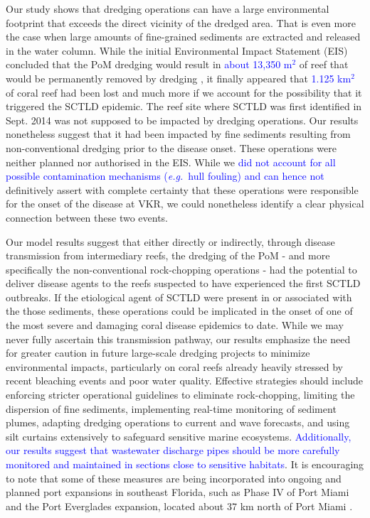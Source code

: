\documentclass[preprint,12pt,authoryear]{elsarticle}
\newcommand{\modif}[1]{\textcolor{blue}{#1}}
\begin{document}
Our study shows that dredging operations can have a large environmental footprint that exceeds the direct vicinity of the dredged area. That is even more the case when large amounts of fine-grained sediments are extracted and released in the water column. While the initial Environmental Impact Statement (EIS) concluded that the PoM dredging would result in \modif{about 13,350 m$^{2}$} of reef that would be permanently removed by dredging \citep{USACE2004}, it finally appeared that \modif{1.125 km$^{2}$} of coral reef had been lost \cite{noaa2023sedimentation} and much more if we account for the possibility that it triggered the SCTLD epidemic. The reef site where SCTLD was first identified in Sept. 2014 was not supposed to be impacted by dredging operations. Our results nonetheless suggest that it had been impacted by fine sediments resulting from non-conventional dredging prior to the disease onset. These operations were neither planned nor authorised in the EIS. While we \modif{did not account for all possible contamination mechanisms (\textit{e.g.}~hull fouling) and can hence not} definitively assert with complete certainty that these operations were responsible for the onset of the disease at VKR, we could nonetheless identify a clear physical connection between these two events.

Our model results suggest that either directly or indirectly, through disease transmission from intermediary reefs, the dredging of the PoM - and more specifically the non-conventional rock-chopping operations - had the potential to deliver disease agents to the reefs suspected to have experienced the first SCTLD outbreaks. If the etiological agent of SCTLD were present in or associated with the those sediments, these operations could be implicated in the onset of one of the most severe and damaging coral disease epidemics to date. While we may never fully ascertain this transmission pathway, our results emphasize the need for greater caution in future large-scale dredging projects to minimize environmental impacts, particularly on coral reefs already heavily stressed by recent bleaching events and poor water quality. Effective strategies should include enforcing stricter operational guidelines to eliminate rock-chopping, limiting the dispersion of fine sediments, implementing real-time monitoring of sediment plumes, adapting dredging operations to current and wave forecasts, and using silt curtains extensively to safeguard sensitive marine ecosystems. \modif{Additionally, our results suggest that wastewater discharge pipes should be more carefully monitored and maintained in sections close to sensitive habitats}. It is encouraging to note that some of these measures are being incorporated into ongoing and planned port expansions in southeast Florida, such as Phase IV of Port Miami and the Port Everglades expansion, located about 37 km north of Port Miami \cite{noaa2023sedimentation}.
\end{document}
